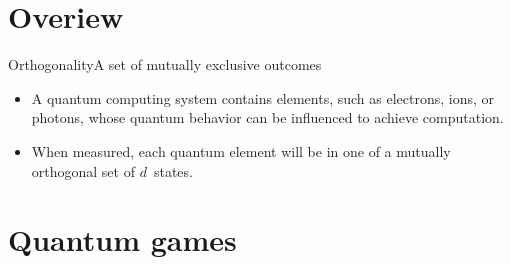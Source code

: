 
\section{Overiew}

\begin{frame}{Orthogonality}{A set of mutually exclusive outcomes}
\begin{itemize}
    \item A quantum computing system contains elements, such as electrons, ions, or photons, whose quantum behavior can be influenced to achieve computation.
    \item When measured, each quantum element will be in one of a mutually orthogonal set of $d$~states.
    
\end{itemize}
\end{frame}

\section{Quantum games}

